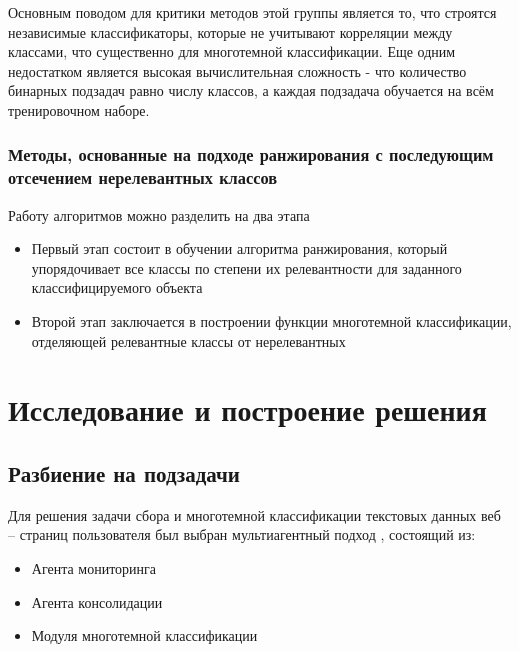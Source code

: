 \documentclass[russian, utf8, emptystyle]{eskdtext}
\begin{document}
Основным поводом для критики методов этой группы является то, что строятся независимые классификаторы, которые не учитывают корреляции между классами, что существенно для многотемной классификации. Еще одним недостатком является высокая вычислительная сложность - что количество бинарных подзадач равно числу классов, а каждая подзадача обучается на всём тренировочном наборе. 
\subsubsection{Методы, основанные на подходе ранжирования с последующим отсечением нерелевантных классов}
Работу алгоритмов можно разделить на два этапа
\begin{itemize}
	\item Первый этап состоит в обучении алгоритма ранжирования, который упорядочивает все классы по степени их релевантности для заданного классифицируемого объекта
	\item Второй этап заключается в построении функции многотемной классификации, отделяющей релевантные классы от нерелевантных
\end{itemize}
\section {Исследование и построение решения}
\subsection{Разбиение на подзадачи}
Для решения задачи сбора и многотемной классификации текстовых данных веб – страниц пользователя был выбран мультиагентный подход \cite{multiagent}, состоящий из:
\begin{itemize}
	\item Агента мониторинга
	\item Агента консолидации
	\item Модуля многотемной классификации
\end{itemize}
\end{document}
